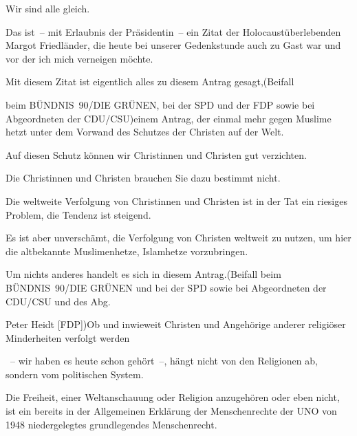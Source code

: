 \documentclass{article}
\begin{document}
\colorbox{CustomColor0}{\parbox{\linewidth}{Wir sind alle gleich.}}

\colorbox{CustomColor5}{\parbox{\linewidth}{Das ist – mit Erlaubnis der Präsidentin – ein Zitat der Holocaustüberlebenden Margot Friedländer, die heute bei unserer Gedenkstunde auch zu Gast war und vor der ich mich verneigen möchte.}}

\colorbox{CustomColor0}{\parbox{\linewidth}{Mit diesem Zitat ist eigentlich alles zu diesem Antrag gesagt,(Beifall}}

\colorbox{CustomColor6}{\parbox{\linewidth}{beim BÜNDNIS 90/DIE GRÜNEN, bei der SPD und der FDP sowie bei Abgeordneten der CDU/CSU)einem Antrag, der einmal mehr gegen Muslime hetzt unter dem Vorwand des Schutzes der Christen auf der Welt.}}

\colorbox{CustomColor7}{\parbox{\linewidth}{Auf diesen Schutz können wir Christinnen und Christen gut verzichten.}}

\colorbox{CustomColor0}{\parbox{\linewidth}{Die Christinnen und Christen brauchen Sie dazu bestimmt nicht.}}

\colorbox{CustomColor8}{\parbox{\linewidth}{Die weltweite Verfolgung von Christinnen und Christen ist in der Tat ein riesiges Problem, die Tendenz ist steigend.}}

\colorbox{CustomColor9}{\parbox{\linewidth}{Es ist aber unverschämt, die Verfolgung von Christen weltweit zu nutzen, um hier die altbekannte Muslimenhetze, Islamhetze vorzubringen.}}

\colorbox{CustomColor10}{\parbox{\linewidth}{Um nichts anderes handelt es sich in diesem Antrag.(Beifall beim BÜNDNIS 90/DIE GRÜNEN und bei der SPD sowie bei Abgeordneten der CDU/CSU und des Abg.}}

\colorbox{CustomColor0}{\parbox{\linewidth}{Peter Heidt [FDP])Ob und inwieweit Christen und Angehörige anderer religiöser Minderheiten verfolgt werden}}

\colorbox{CustomColor0}{\parbox{\linewidth}{ – wir haben es heute schon gehört –, hängt nicht von den Religionen ab, sondern vom politischen System.}}

\colorbox{CustomColor11}{\parbox{\linewidth}{Die Freiheit, einer Weltanschauung oder Religion anzugehören oder eben nicht, ist ein bereits in der Allgemeinen Erklärung der Menschenrechte der UNO von 1948 niedergelegtes grundlegendes Menschenrecht.}}
\end{document}
